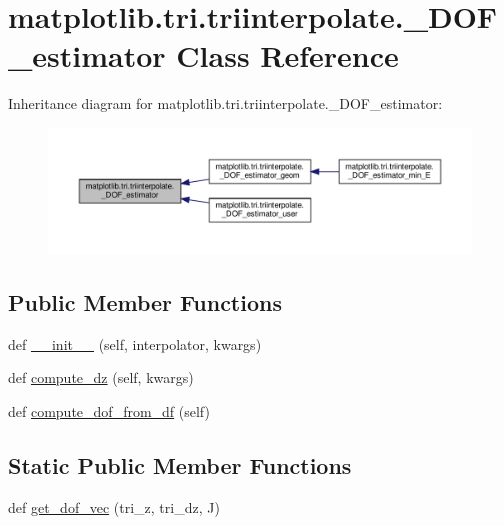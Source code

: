 \hypertarget{classmatplotlib_1_1tri_1_1triinterpolate_1_1__DOF__estimator}{}\section{matplotlib.\+tri.\+triinterpolate.\+\_\+\+D\+O\+F\+\_\+estimator Class Reference}
\label{classmatplotlib_1_1tri_1_1triinterpolate_1_1__DOF__estimator}


Inheritance diagram for matplotlib.\+tri.\+triinterpolate.\+\_\+\+D\+O\+F\+\_\+estimator\+:
\nopagebreak
\begin{figure}[H]
\begin{center}
\leavevmode
\includegraphics[width=350pt]{classmatplotlib_1_1tri_1_1triinterpolate_1_1__DOF__estimator__inherit__graph}
\end{center}
\end{figure}
\subsection*{Public Member Functions}
\begin{DoxyCompactItemize}
\item 
def \hyperlink{classmatplotlib_1_1tri_1_1triinterpolate_1_1__DOF__estimator_a3f79e9bc6536e5b67d05ea80b37668a0}{\+\_\+\+\_\+init\+\_\+\+\_\+} (self, interpolator, kwargs)
\item 
def \hyperlink{classmatplotlib_1_1tri_1_1triinterpolate_1_1__DOF__estimator_aaa8ee58a8d2647eef9ef4e3a264a6519}{compute\+\_\+dz} (self, kwargs)
\item 
def \hyperlink{classmatplotlib_1_1tri_1_1triinterpolate_1_1__DOF__estimator_a82e241f9ae7de44ef3fe71a87ce20b66}{compute\+\_\+dof\+\_\+from\+\_\+df} (self)
\end{DoxyCompactItemize}
\subsection*{Static Public Member Functions}
\begin{DoxyCompactItemize}
\item 
def \hyperlink{classmatplotlib_1_1tri_1_1triinterpolate_1_1__DOF__estimator_a52f8c3d59afa7c339b7785aa10f8f543}{get\+\_\+dof\+\_\+vec} (tri\+\_\+z, tri\+\_\+dz, J)
\end{DoxyCompactItemize}

